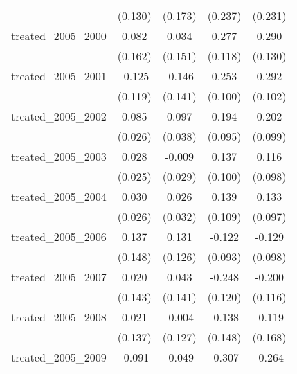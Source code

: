 {\begin{tabular}{l*{4}{c}}
            &     (0.130)         &     (0.173)         &     (0.237)         &     (0.231)         \\
[1em]
treated\_2005\_2000&       0.082         &       0.034         &       0.277\sym{*}  &       0.290\sym{*}  \\
            &     (0.162)         &     (0.151)         &     (0.118)         &     (0.130)         \\
[1em]
treated\_2005\_2001&      -0.125         &      -0.146         &       0.253\sym{*}  &       0.292\sym{**} \\
            &     (0.119)         &     (0.141)         &     (0.100)         &     (0.102)         \\
[1em]
treated\_2005\_2002&       0.085\sym{**} &       0.097\sym{*}  &       0.194\sym{*}  &       0.202\sym{*}  \\
            &     (0.026)         &     (0.038)         &     (0.095)         &     (0.099)         \\
[1em]
treated\_2005\_2003&       0.028         &      -0.009         &       0.137         &       0.116         \\
            &     (0.025)         &     (0.029)         &     (0.100)         &     (0.098)         \\
[1em]
treated\_2005\_2004&       0.030         &       0.026         &       0.139         &       0.133         \\
            &     (0.026)         &     (0.032)         &     (0.109)         &     (0.097)         \\
[1em]
treated\_2005\_2006&       0.137         &       0.131         &      -0.122         &      -0.129         \\
            &     (0.148)         &     (0.126)         &     (0.093)         &     (0.098)         \\
[1em]
treated\_2005\_2007&       0.020         &       0.043         &      -0.248\sym{*}  &      -0.200         \\
            &     (0.143)         &     (0.141)         &     (0.120)         &     (0.116)         \\
[1em]
treated\_2005\_2008&       0.021         &      -0.004         &      -0.138         &      -0.119         \\
            &     (0.137)         &     (0.127)         &     (0.148)         &     (0.168)         \\
[1em]
treated\_2005\_2009&      -0.091         &      -0.049         &      -0.307\sym{*}  &      -0.264         \\

\end{tabular}}

